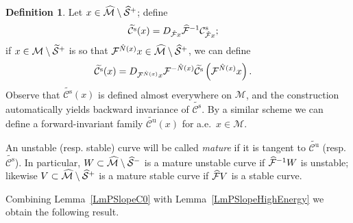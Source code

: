\documentclass[10pt]{amsart}
\theoremstyle{definition}\newtheorem{defi}[theo]{Definition}\newtheorem{rema}[theo]{Remark}\newtheorem{exam}[theo]{Example}\newtheorem{exem}[theo]{Example}\newtheorem{nota}[theo]{Notation}
\newcommand{\inv}{^{-1}}
\newcommand{\unstable}{\text{u}}
\newcommand{\stable}{\text{s}}
\newcommand{\cm}{\mathcal{F}}
\newcommand{\csp}{\mathcal{M}}
\newcommand{\cmp}{\hat\cm}
\newcommand{\cone}{\mathcal{C}}
\newcommand{\cspi}{\widehat{\csp}}
\newcommand{\coneu}{\cone^\unstable}
\newcommand{\cones}{\cone^\stable}
\newcommand{\mconeu}{{\widetilde{\coneu}}}
\newcommand{\mcones}{{\widetilde{\cones}}}
\newcommand{\singPrivate}{\mathcal{S}}
\newcommand{\singp}[1]{\hat{\singPrivate}^{#1}}
\newcommand{\singt}[1]{\tilde{\singPrivate}^{#1}}
\newcommand{\Np}{\hat N}
\let\oldtilde\tilde
\renewcommand*{\tilde}[1]{\mathchoice{\widetilde{#1}}{\widetilde{#1}}{\oldtilde{#1}}{\oldtilde{#1}}}
\let\oldhat\hat
\renewcommand*{\hat}[1]{\mathchoice{\widehat{#1}}{\widehat{#1}}{\oldhat{#1}}{\oldhat{#1}}}
\begin{document}
\begin{defi}\label{def:mature-cones}
Let $x\in\cspi\setminus\singp+$; define
\begin{align*}
\mcones(x)&=D_{\cmp x}\cmp\inv\cones_{\cmp x};
\end{align*}
if $x\in\csp\setminus\singt+$ is so that $\cm^{\Np(x)}x\in\cspi\setminus\singp+$, we can define
\begin{align*}
\mcones(x) &= D_{\cm^{\Np(x)}x}\cm^{-\Np(x)}\mcones\left(\cm^{\Np(x)}x\right).
\end{align*}
Observe that $\mcones(x)$ is defined almost everywhere on $\csp$, and the construction automatically yields backward invariance of $\mcones$. By a similar scheme we can define a forward-invariant family $\mconeu(x)$ for a.e.\ $x\in\csp$.


An unstable (resp. stable) curve will be called \emph{mature} if it is tangent to $\mconeu$ (resp.~$\mcones$). In particular, $W\subset\cspi\setminus\singp-$ is a mature unstable curve if $\cmp^{-1} W$ is unstable; likewise $V\subset\cspi\setminus\singp+$ is a mature stable curve if $\cmp V$ is a stable curve.
\end{defi}

Combining Lemma~\ref{LmPSlopeC0} with Lemma~\ref{LmPSlopeHighEnergy} we obtain the following result.
\end{document}
